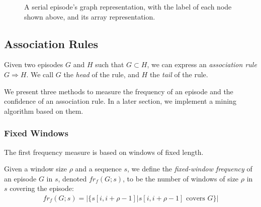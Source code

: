\begin{itemize}
\begin{figure}

\caption{A serial episode's graph representation, with the label of each node shown above, and its array representation.}

\end{figure}

\end{itemize}

\subsection{Association Rules}
\begin{definition}
Given two episodes $ G $ and $ H $ such that $ G \subset H $, we can express an \emph{association rule} $ G \Rightarrow H $. We call $ G $ the \emph{head} of the rule, and $ H $ the \emph{tail} of the rule.
\end{definition}

We present three methods to measure the frequency of an episode and the confidence of an association rule. In a later section, we implement a mining algorithm based on them.

\subsubsection{Fixed Windows}

The first frequency measure is based on windows of fixed length.

\begin{definition}
Given a window size $ \rho $ and a sequence $ s $, we define the \emph{fixed-window frequency} of an episode $ G $ in $ s $, denoted $ fr_f(G; s) $, to be the number of windows of size $ \rho $ in $ s $ covering the episode:
\begin{align*}
fr_f(G; s) = | \{ s[i, i + \rho - 1] | s[i, i + \rho - 1] \text{ covers } G \} |
\end{align*}
\end{definition}

